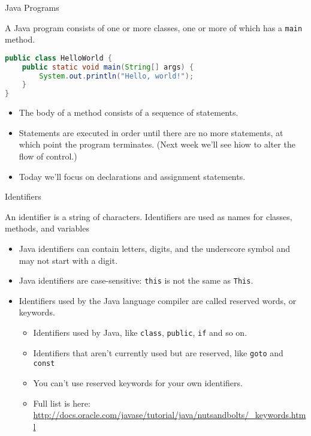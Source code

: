 \documentclass{beamer}
\author[Chris Simpkins] 
{Christopher Simpkins \\\texttt{chris.simpkins@gatech.edu}}
\institute[Georgia Tech] %
\begin{document}
\begin{frame}
  \titlepage
\end{frame}

\begin{frame}[fragile]{Java Programs}


A Java program consists of one or more classes, one or more of which has a {\tt main} method.
\begin{lstlisting}[language=Java]
public class HelloWorld {
    public static void main(String[] args) {
        System.out.println("Hello, world!");
    }
}
\end{lstlisting}
\begin{itemize}
\item The body of a method consists of a sequence of statements.
\item Statements are executed in order until there are no more statements, at which point the program terminates. (Next week we'll see hiow to alter the flow of control.)
\item Today we'll focus on declarations and assignment statements.
\end{itemize}

\end{frame}

\begin{frame}[fragile]{Identifiers}


An identifier is a string of characters.  Identifiers are used as names for classes, methods, and variables
\begin{itemize}
\item Java identifiers can contain letters, digits, and the underscore symbol and may not start with a digit.
\item Java identifiers are case-sensitive:  {\tt this} is not the same as {\tt This}.
\item Identifiers used by the Java language compiler are called reserved words, or keywords.  
\begin{itemize}
\item Identifiers used by Java, like {\tt class}, {\tt public}, {\tt if} and so on.
\item Identifiers that aren't currently used but are reserved, like {\tt goto} and {\tt const}
\item You can't use reserved keywords for your own identifiers.
\item Full list is here: \url{http://docs.oracle.com/javase/tutorial/java/nutsandbolts/_keywords.html}
\end{itemize}

\end{itemize}


\end{frame}
\end{document}
